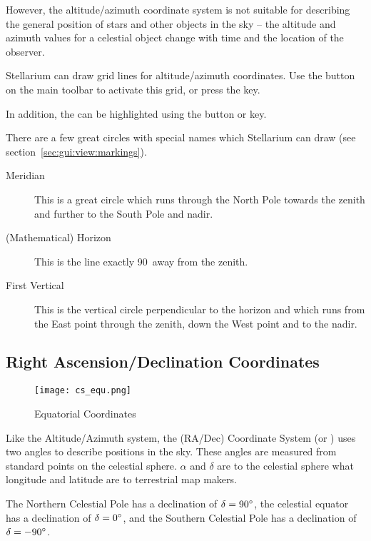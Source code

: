 However, the altitude/azimuth coordinate system is not suitable for
describing the general position of stars and other objects in the sky --
the altitude and azimuth values for a celestial object change with
time and the location of the observer.

Stellarium can draw grid lines for altitude/azimuth coordinates. Use the 
button on the main toolbar to activate this grid, or press the  key.

In addition, the  can be highlighted using
the  button or  key.

There are a few great circles with special names which Stellarium can
draw (see section~\ref{sec:gui:view:markings}).
\begin{description}
\item[Meridian] This is a great circle which runs through the North
  Pole towards the zenith and further to the South Pole and nadir.
\item[(Mathematical) Horizon] This is the line exactly 90\degree\ away
  from the zenith.
\item[First Vertical] This is the vertical circle perpendicular to the horizon and which runs from the East
  point through the zenith, down the West point and to the nadir.
\end{description}

\subsection{Right Ascension/Declination Coordinates}
\label{sec:Concepts:Equatorial}

\begin{figure}[ht]
\centering\texttt{[image: cs\_equ.png]}
\caption{Equatorial Coordinates}
\label{fig:EquatorialCoordinates}
\end{figure}

Like the Altitude/Azimuth system, the 
(RA/Dec) Coordinate System (or ) uses two angles to describe positions in the sky. These angles are measured from standard points on the celestial
sphere.  $\alpha$ and  $\delta$ are to the celestial sphere what
longitude and latitude are to terrestrial map makers.

The Northern Celestial Pole has a declination of $\delta=90\degree$, the celestial
equator has a declination of $\delta=0\degree$, and the Southern Celestial Pole has a declination of $\delta=-90\degree$.

